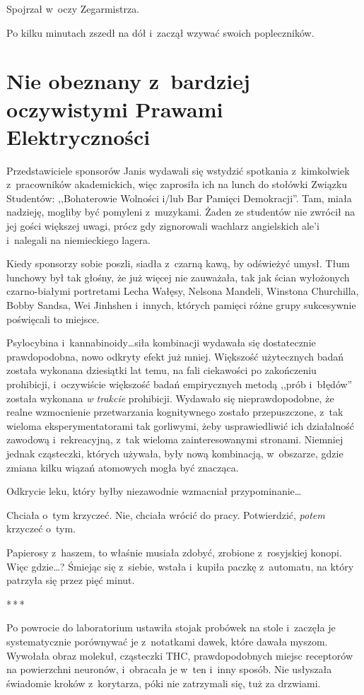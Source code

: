 \documentclass[oneside,polish,11pt,sfheadings]{mwbk}
\newcommand{\threeast}{\bigskip\par\centerline{*\,*\,*}\medskip\par}%
\begin{document}
Spojrzał w~oczy Zegarmistrza.

Po kilku minutach zszedł na dół i~zaczął wzywać swoich popleczników.

\chapter{Nie obeznany z~bardziej oczywistymi Prawami Elektryczności}

Przedstawiciele sponsorów Janis wydawali się wstydzić spotkania z~kimkolwiek z~pracowników akademickich, więc zaprosiła ich na lunch do
stołówki Związku Studentów: ,,Bohaterowie Wolności i/lub Bar Pamięci
Demokracji''. Tam, miała nadzieję, mogliby być pomyleni z~muzykami.
Żaden ze studentów nie zwrócił na jej gości większej uwagi, prócz gdy
zignorowali wachlarz angielskich ale'i i~nalegali na niemieckiego
lagera.

Kiedy sponsorzy sobie poszli, siadła z~czarną kawą, by odświeżyć umysł.
Tłum lunchowy był tak głośny, że już więcej nie zauważała, tak jak ścian
wyłożonych czarno-bia\-łymi portretami Lecha Wałęsy, Nelsona Mandeli,
Winstona Churchilla, Bobby Sandsa, Wei Jinhshen i~innych, których
pamięci różne grupy sukcesywnie poświęcali to miejsce.

Psylocybina i~kannabinoidy\ldots siła kombinacji wydawała się dostatecznie
prawdopodobna, nowo odkryty efekt już mniej. Większość użytecznych badań
została wykonana dziesiątki lat temu, na fali ciekawości po zakończeniu
prohibicji, i~oczywiście większość badań empirycznych metodą ,,prób i~błędów'' została wykonana \emph{w trakcie} prohibicji. Wydawało się
nieprawdopodobne, że realne wzmocnienie przetwarzania kognitywnego
zostało przepuszczone, z~tak wieloma eksperymentatorami tak gorliwymi,
żeby usprawiedliwić ich działalność zawodową i~rekreacyjną, z~tak
wieloma zainteresowanymi stronami. Niemniej jednak cząsteczki, których
używała, były nową kombinacją, w~obszarze, gdzie zmiana kilku wiązań
atomowych mogła być znacząca.

Odkrycie leku, który byłby niezawodnie wzmacniał przypominanie\ldots

Chciała o~tym krzyczeć. Nie, chciała wrócić do pracy. Potwierdzić,
\emph{potem} krzyczeć o~tym.

Papierosy z~haszem, to właśnie musiała zdobyć, zrobione z~rosyjskiej
konopi. Więc gdzie\ldots? Śmiejąc się z~siebie, wstała i~kupiła paczkę z~automatu, na który patrzyła się przez pięć minut.
  \threeast 

Po powrocie do laboratorium ustawiła stojak probówek na stole i~zaczęła
je systematycznie porównywać je z~notatkami dawek, które dawała myszom.
Wywołała obraz molekuł, cząsteczki THC, prawdopodobnych miejsc
receptorów na powierzchni neuronów, i~obracała je w~ten i~inny sposób.
Nie usłyszała świadomie kroków z~korytarza, póki nie zatrzymali się, tuż
za drzwiami.
\end{document}
